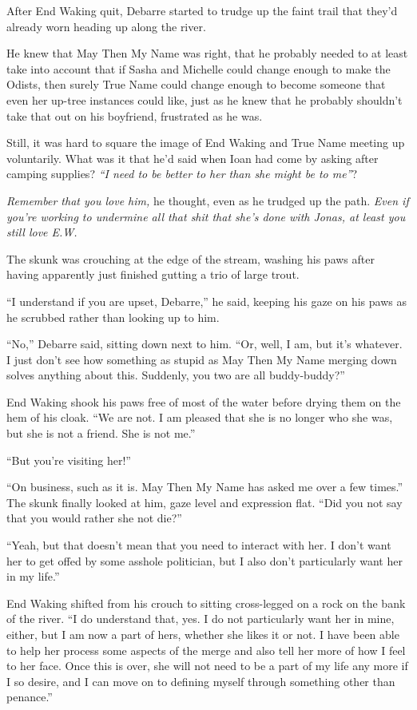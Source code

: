 After End Waking quit, Debarre started to trudge up the faint trail that they'd already worn heading up along the river.

He knew that May Then My Name was right, that he probably needed to at least take into account that if Sasha and Michelle could change enough to make the Odists, then surely True Name could change enough to become someone that even her up-tree instances could like, just as he knew that he probably shouldn't take that out on his boyfriend, frustrated as he was.

Still, it was hard to square the image of End Waking and True Name meeting up voluntarily. What was it that he'd said when Ioan had come by asking after camping supplies? \emph{``I need to be better to her than she might be to me''}?

\emph{Remember that you love him,} he thought, even as he trudged up the path. \emph{Even if you're working to undermine all that shit that she's done with Jonas, at least you still love E.W.}

The skunk was crouching at the edge of the stream, washing his paws after having apparently just finished gutting a trio of large trout.

``I understand if you are upset, Debarre,'' he said, keeping his gaze on his paws as he scrubbed rather than looking up to him.

``No,'' Debarre said, sitting down next to him. ``Or, well, I am, but it's whatever. I just don't see how something as stupid as May Then My Name merging down solves anything about this. Suddenly, you two are all buddy-buddy?''

End Waking shook his paws free of most of the water before drying them on the hem of his cloak. ``We are not. I am pleased that she is no longer who she was, but she is not a friend. She is not me.''

``But you're visiting her!''

``On business, such as it is. May Then My Name has asked me over a few times.'' The skunk finally looked at him, gaze level and expression flat. ``Did you not say that you would rather she not die?''

``Yeah, but that doesn't mean that you need to interact with her. I don't want her to get offed by some asshole politician, but I also don't particularly want her in my life.''

End Waking shifted from his crouch to sitting cross-legged on a rock on the bank of the river. ``I do understand that, yes. I do not particularly want her in mine, either, but I am now a part of hers, whether she likes it or not. I have been able to help her process some aspects of the merge and also tell her more of how I feel to her face. Once this is over, she will not need to be a part of my life any more if I so desire, and I can move on to defining myself through something other than penance.''

